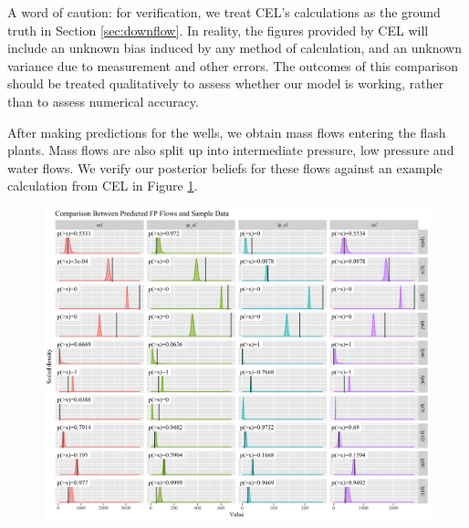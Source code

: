 \documentclass[a4paper, 12pt]{article}
\begin{document}
A word of caution: for verification, we treat CEL's calculations as the ground truth in Section \ref{sec:downflow}. In reality, the figures provided by CEL will include an unknown bias induced by any method of calculation, and an unknown variance due to measurement and other errors. The outcomes of this comparison should be treated qualitatively to assess whether our model is working, rather than to assess numerical accuracy.

After making predictions for the wells, we obtain mass flows entering the flash plants. Mass flows are also split up into intermediate pressure, low pressure and water flows. We verify our posterior beliefs for these flows against an example calculation from CEL in Figure \ref{fig:verification}. 

\begin{figure}
  \centering
  \includegraphics[width=\linewidth]{media/verification}
  \label{fig:verification}
\end{figure}
\end{document}
